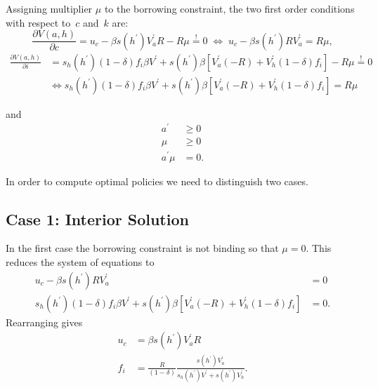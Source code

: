 \documentclass[a4paper,12pt]{article}%
\begin{document}
Assigning multiplier $\mu$ to the borrowing constraint, the two first order conditions with respect to~$c$ and~$k$ are:
\begin{equation}
\frac{\partial V\left(  a,h\right)  }{\partial c}=u_{c}-\beta s\left(h^{\prime}\right)  V_{a}^{\prime}R-R\mu\overset{!}{=}0\;\Leftrightarrow\;u_{c}-\beta s\left(  h^{\prime}\right)  RV_{a}^{\prime}=R\mu, \label{FOC1}%
\end{equation}
\begin{align}
\frac{\partial V\left(  a,h\right)  }{\partial i}  &  =s_{h}\left(  h^{\prime}\right)  \left(  1-\delta\right)  f_{i}\beta V^{\prime}+s\left(  h^{\prime}\right)  \beta\left[  V_{a}^{\prime}\left(  -R\right)  +V_{h}^{\prime}\left(1-\delta\right)  f_{i}\right]  -R\mu\overset{!}{=}0\nonumber \\
&  \Leftrightarrow s_{h}\left(  h^{\prime}\right)  \left(  1-\delta\right)f_{i}\beta V^{\prime}+s\left(  h^{\prime}\right)  \beta\left[  V_{a}^{\prime}\left(  -R\right)  +V_{h}^{\prime}\left(  1-\delta\right)  f_{i}\right] = R\mu \label{FOC2}
\end{align}

and
\begin{align*}
a^{\prime}  &  \geq0\\
\mu &  \geq0\\
a^{\prime}\mu &  =0.
\end{align*}

In order to compute optimal policies we need to distinguish two cases.

\subsection*{Case 1: Interior Solution}

In the first case the borrowing constraint is not binding so that $\mu=0$. This reduces the system of equations to%
\begin{align*}
u_{c}-\beta s\left(  h^{\prime}\right)  RV_{a}^{\prime}  &  =0 \\
s_{h}\left(  h^{\prime}\right)  \left(  1-\delta\right)  f_{i}\beta V^{\prime}+s\left(  h^{\prime}\right)  \beta\left[  V_{a}^{\prime}\left(  -R\right)+V_{h}^{\prime}\left(  1-\delta\right)  f_{i}\right]   &  =0.
\end{align*}
Rearranging gives
\begin{align*}
u_{c}  &  =\beta s\left(  h^{\prime}\right) V_{a}^{\prime}R \\
f_{i}  &  =\frac{R}{\left(  1-\delta\right)  }\frac{s\left(h^{\prime}\right)  V_{a}^{\prime}}{s_{h}\left(  h^{\prime}\right)  V^{\prime}+s\left(h^{\prime}\right)  V_{h}^{\prime}}.
\end{align*}
\end{document}
